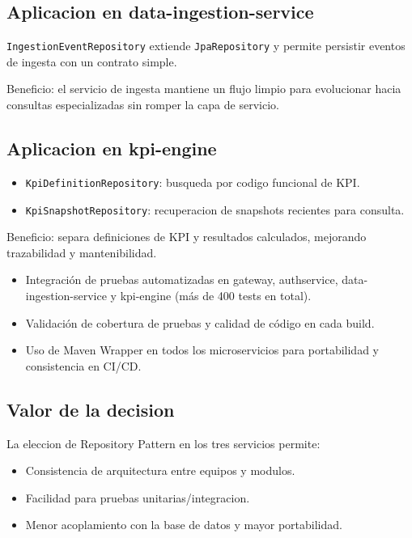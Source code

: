 \documentclass[12pt,a4paper]{article}
\begin{document}
\subsection{Aplicacion en data-ingestion-service}
\texttt{IngestionEventRepository} extiende \texttt{JpaRepository} y permite persistir eventos de ingesta con un contrato simple.

Beneficio: el servicio de ingesta mantiene un flujo limpio para evolucionar hacia consultas especializadas sin romper la capa de servicio.

\subsection{Aplicacion en kpi-engine}
\begin{itemize}[leftmargin=*]
    \item \texttt{KpiDefinitionRepository}: busqueda por codigo funcional de KPI.
    \item \texttt{KpiSnapshotRepository}: recuperacion de snapshots recientes para consulta.
\end{itemize}

Beneficio: separa definiciones de KPI y resultados calculados, mejorando trazabilidad y mantenibilidad.

    \begin{itemize}[leftmargin=*]
        \item Integración de pruebas automatizadas en gateway, authservice, data-ingestion-service y kpi-engine (más de 400 tests en total).
        \item Validación de cobertura de pruebas y calidad de código en cada build.
        \item Uso de Maven Wrapper en todos los microservicios para portabilidad y consistencia en CI/CD.
    \end{itemize}
\subsection{Valor de la decision}
La eleccion de Repository Pattern en los tres servicios permite:
\begin{itemize}[leftmargin=*]
    \item Consistencia de arquitectura entre equipos y modulos.
    \item Facilidad para pruebas unitarias/integracion.
    \item Menor acoplamiento con la base de datos y mayor portabilidad.
\end{itemize}
\end{document}
